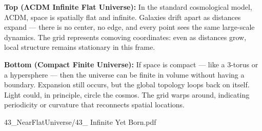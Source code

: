 \begin{SideNotePage}{
  \textbf{Top (ΛCDM Infinite Flat Universe):}  
  In the standard cosmological model, ΛCDM, space is spatially flat and infinite. Galaxies drift apart as distances expand — there is no center, no edge, and every point sees the same large-scale dynamics. The grid represents comoving coordinates: even as distances grow, local structure remains stationary in this frame. \par

  \textbf{Bottom (Compact Finite Universe):}  
  If space is compact — like a 3-torus or a hypersphere — then the universe can be finite in volume without having a boundary. Expansion still occurs, but the global topology loops back on itself. Light could, in principle, circle the cosmos. The grid warps around, indicating periodicity or curvature that reconnects spatial locations. \par
}{43_NearFlatUniverse/43_ Infinite Yet Born.pdf}
\end{SideNotePage}
